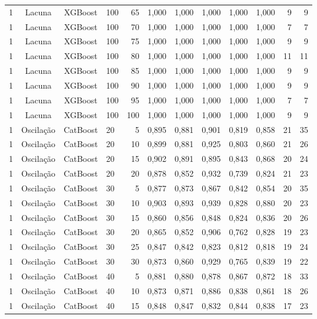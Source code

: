 \begin{longtable}{ccclrrrrrrrr}
1 & Lacuna & XGBoost & 100 & 65 & 1,000 & 1,000 & 1,000 & 1,000 & 1,000 & 9 & 9 \\
1 & Lacuna & XGBoost & 100 & 70 & 1,000 & 1,000 & 1,000 & 1,000 & 1,000 & 7 & 7 \\
1 & Lacuna & XGBoost & 100 & 75 & 1,000 & 1,000 & 1,000 & 1,000 & 1,000 & 9 & 9 \\
1 & Lacuna & XGBoost & 100 & 80 & 1,000 & 1,000 & 1,000 & 1,000 & 1,000 & 11 & 11 \\
1 & Lacuna & XGBoost & 100 & 85 & 1,000 & 1,000 & 1,000 & 1,000 & 1,000 & 9 & 9 \\
1 & Lacuna & XGBoost & 100 & 90 & 1,000 & 1,000 & 1,000 & 1,000 & 1,000 & 9 & 9 \\
1 & Lacuna & XGBoost & 100 & 95 & 1,000 & 1,000 & 1,000 & 1,000 & 1,000 & 7 & 7 \\
1 & Lacuna & XGBoost & 100 & 100 & 1,000 & 1,000 & 1,000 & 1,000 & 1,000 & 9 & 9 \\
1 & Oscilação & CatBoost & 20 & 5 & 0,895 & 0,881 & 0,901 & 0,819 & 0,858 & 21 & 35 \\
1 & Oscilação & CatBoost & 20 & 10 & 0,899 & 0,881 & 0,925 & 0,803 & 0,860 & 21 & 26 \\
1 & Oscilação & CatBoost & 20 & 15 & 0,902 & 0,891 & 0,895 & 0,843 & 0,868 & 20 & 24 \\
1 & Oscilação & CatBoost & 20 & 20 & 0,878 & 0,852 & 0,932 & 0,739 & 0,824 & 21 & 23 \\
1 & Oscilação & CatBoost & 30 & 5 & 0,877 & 0,873 & 0,867 & 0,842 & 0,854 & 20 & 35 \\
1 & Oscilação & CatBoost & 30 & 10 & 0,903 & 0,893 & 0,939 & 0,828 & 0,880 & 20 & 23 \\
1 & Oscilação & CatBoost & 30 & 15 & 0,860 & 0,856 & 0,848 & 0,824 & 0,836 & 20 & 26 \\
1 & Oscilação & CatBoost & 30 & 20 & 0,865 & 0,852 & 0,906 & 0,762 & 0,828 & 19 & 23 \\
1 & Oscilação & CatBoost & 30 & 25 & 0,847 & 0,842 & 0,823 & 0,812 & 0,818 & 19 & 24 \\
1 & Oscilação & CatBoost & 30 & 30 & 0,873 & 0,860 & 0,929 & 0,765 & 0,839 & 19 & 22 \\
1 & Oscilação & CatBoost & 40 & 5 & 0,881 & 0,880 & 0,878 & 0,867 & 0,872 & 18 & 33 \\
1 & Oscilação & CatBoost & 40 & 10 & 0,873 & 0,871 & 0,886 & 0,838 & 0,861 & 18 & 26 \\
1 & Oscilação & CatBoost & 40 & 15 & 0,848 & 0,847 & 0,832 & 0,844 & 0,838 & 17 & 23 \\

\end{longtable}
